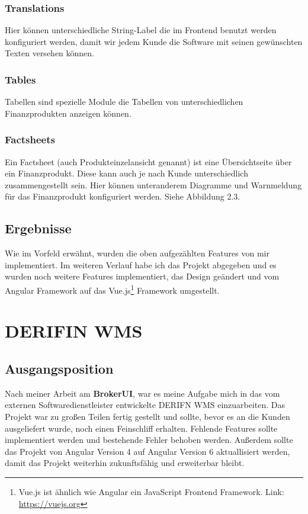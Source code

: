 \documentclass[chapterprefix=false, 12pt, a4paper, oneside, parskip=half, listof=totoc, bibliography=totoc, numbers=noendperiod]{scrbook}
\begin{document}
    \subsubsection{Translations}

    Hier können unterschiedliche String-Label die im Frontend benutzt werden konfiguriert werden, damit wir jedem Kunde
    die Software mit seinen gewünschten Texten versehen können.

    \subsubsection{Tables}

    Tabellen sind spezielle Module die Tabellen von unterschiedlichen Finanzprodukten anzeigen können.

    \subsubsection{Factsheets}

    Ein Factsheet (auch Produkteinzelansicht genannt) ist eine Übersichtseite über ein Finanzprodukt. Diese kann auch je nach Kunde unterschiedlich zusammengestellt sein.
    Hier können unteranderem Diagramme und Warnmeldung für das Finanzprodukt konfiguriert werden. Siehe Abbildung 2.3.

    \subsection{Ergebnisse}

    Wie im Vorfeld erwähnt, wurden die oben aufgezählten Features von mir implementiert. Im weiteren Verlauf habe ich das Projekt
    abgegeben und es wurden noch weitere Features implementiert, das Design geändert und vom Angular Framework
    auf das Vue.js\footnote{Vue.js ist ähnlich wie Angular ein JavaScript Frontend Framework. Link: \url{https://vuejs.org}}
    Framework umgestellt.

    \section{DERIFIN WMS}

    \subsection{Ausgangsposition}

    Nach meiner Arbeit am \textbf{BrokerUI}, war es meine Aufgabe mich in das vom externen Softwaredienstleister
    entwickelte DERIFN WMS einzuarbeiten. Das Projekt war zu großen Teilen fertig gestellt und sollte, bevor es an die
    Kunden ausgeliefert wurde, noch einen Feinschliff erhalten. Fehlende Features sollte implementiert werden und bestehende
    Fehler behoben werden. Außerdem sollte das Projekt von Angular Version 4 auf Angular Version 6 aktuallisiert werden, damit
    das Projekt weiterhin zukunftsfähig und erweiterbar bleibt.
\end{document}
